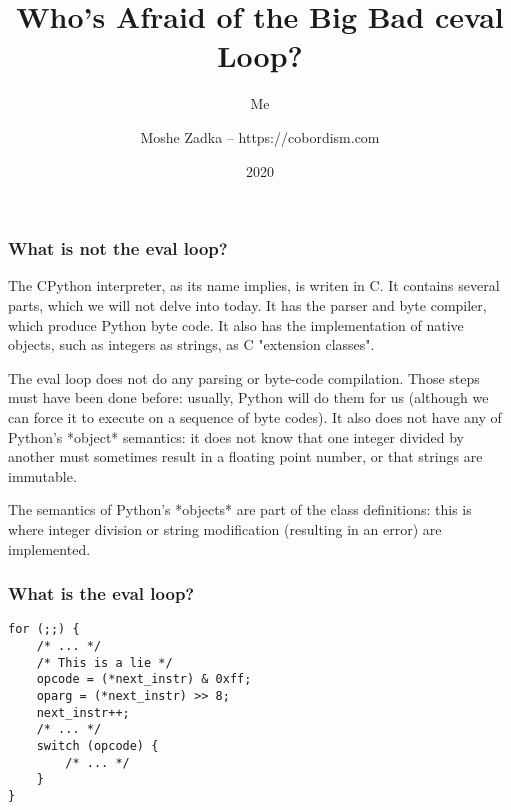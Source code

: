 \usepackage{hyperref}
\usepackage{graphicx}
\usepackage{listings}
\usepackage{textcomp}
\usepackage{fancyvrb}


\title{Who's Afraid of the Big Bad ceval Loop?}
\subtitle{Me}
\author{Moshe Zadka -- https://cobordism.com}
\date{2020}


\begin{titlepage}
\maketitle
\end{titlepage}

\frame{\titlepage}

\begin{frame}
\frametitle{What is not the eval loop?}
\end{frame}

The CPython interpreter,
as its name implies,
is writen in C.
It contains several parts,
which we will not delve into today.
It has the parser and byte compiler,
which produce Python byte code.
It also has the implementation of
native objects,
such as integers as strings,
as C
"extension classes".

The eval loop does not do any parsing or byte-code compilation.
Those steps must have been done before:
usually,
Python will do them for us
(although we can force it to execute on a sequence
of byte codes).
It also does not have any of Python's
*object*
semantics:
it does not know that one integer divided by another must sometimes
result in a floating point number,
or that strings are immutable.

The semantics of Python's
*objects*
are part of the class definitions:
this is where integer division
or string modification
(resulting in an error)
are implemented.

\begin{frame}
\frametitle{What is the eval loop?}

\begin{lstlisting}
for (;;) {
    /* ... */
    /* This is a lie */
    opcode = (*next_instr) & 0xff;
    oparg = (*next_instr) >> 8;
    next_instr++;
    /* ... */
    switch (opcode) {
        /* ... */
    }
}
\end{lstlisting}

\end{frame}

